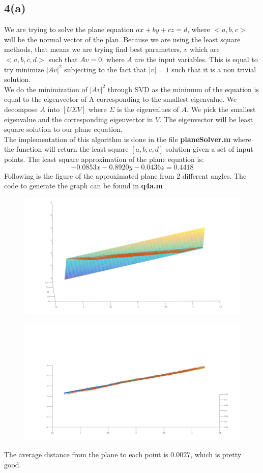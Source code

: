 \documentclass{article}
\begin{document}
\subsection*{4(a)}
We are trying to solve the plane equation $ax +by + cz = d$, where $<a,b,c>$ will be the normal vector of the plan. Because we are using the least square methods, that means we are trying find best parameters, $v$ which are $<a,b,c,d>$ such that $Av = 0$, where $A$ are the input variables. This is equal to try minimize $|Av|^2$ subjecting to the fact that $|v| = 1$ such that it is a non trivial solution.\\
We do the minimization of $|Av|^2$ through SVD as the minimum of the equation is equal to the eigenvector of A corresponding to the smallest eigenvalue. We decompose $A$ into $[U \Sigma V]$ where $\Sigma$ is the eigenvalues of $A$. We pick the smallest eigenvalue and the corresponding eigenvector in $V$. The eigenvector will be least square solution to our plane equation.\\
The implementation of this algorithm is done in the file \textbf{planeSolver.m} where the function will return the least square $[a,b,c,d]$ solution given a set of input points. The least square approximation of the plane equation is:
\begin{equation*}
-0.0853x - 0.8920y - 0.0436z = 0.4418
\end{equation*}
Following is the figure of the approximated plane from 2 different angles. The code to generate the graph can be found in \textbf{q4a.m}
\begin{figure}[H]
\centering
\includegraphics[width=5in]{figures/q4a_1.jpg}
\end{figure}
\begin{figure}[H]
\centering
\includegraphics[width=5in]{figures/q4a_1-alt.jpg}
\end{figure}
The average distance from the plane to each point is $0.0027$, which is pretty good.
\end{document}
